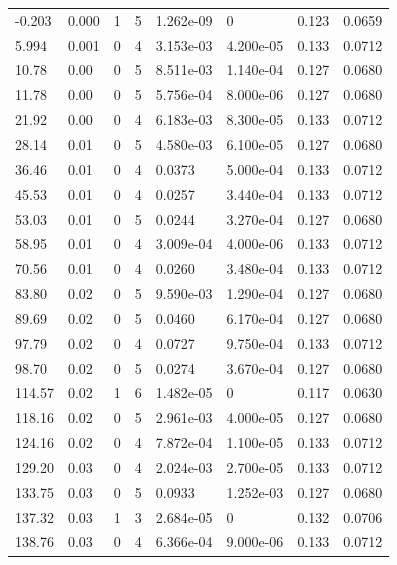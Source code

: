 \documentclass[preview]{standalone}
\begin{document}
{{\begin{tabular}{L{1.2cm}C{1.2cm} C{0.3cm}C{0.5cm} C{1.4cm}C{1.4cm} C{1.4cm}C{1.4cm}}
  -0.203  &  0.000  & 1     &  5 &  1.262e-09  & 0  & 0.123 &  0.0659   \\ 
  5.994  &  0.001  & 0     &  4 &  3.153e-03  & 4.200e-05  & 0.133 &  0.0712   \\ 
  10.78  &  0.00  & 0     &  5 &  8.511e-03  & 1.140e-04  & 0.127 &  0.0680   \\ 
  11.78  &  0.00  & 0     &  5 &  5.756e-04  & 8.000e-06  & 0.127 &  0.0680   \\ 
  21.92  &  0.00  & 0     &  4 &  6.183e-03  & 8.300e-05  & 0.133 &  0.0712   \\ 
  28.14  &  0.01  & 0     &  5 &  4.580e-03  & 6.100e-05  & 0.127 &  0.0680   \\ 
  36.46  &  0.01  & 0     &  4 &  0.0373  & 5.000e-04  & 0.133 &  0.0712   \\ 
  45.53  &  0.01  & 0     &  4 &  0.0257  & 3.440e-04  & 0.133 &  0.0712   \\ 
  53.03  &  0.01  & 0     &  5 &  0.0244  & 3.270e-04  & 0.127 &  0.0680   \\ 
  58.95  &  0.01  & 0     &  4 &  3.009e-04  & 4.000e-06  & 0.133 &  0.0712   \\ 
  70.56  &  0.01  & 0     &  4 &  0.0260  & 3.480e-04  & 0.133 &  0.0712   \\ 
  83.80  &  0.02  & 0     &  5 &  9.590e-03  & 1.290e-04  & 0.127 &  0.0680   \\ 
  89.69  &  0.02  & 0     &  5 &  0.0460  & 6.170e-04  & 0.127 &  0.0680   \\ 
  97.79  &  0.02  & 0     &  4 &  0.0727  & 9.750e-04  & 0.133 &  0.0712   \\ 
  98.70  &  0.02  & 0     &  5 &  0.0274  & 3.670e-04  & 0.127 &  0.0680   \\ 
  114.57  &  0.02  & 1     &  6 &  1.482e-05  & 0  & 0.117 &  0.0630   \\ 
  118.16  &  0.02  & 0     &  5 &  2.961e-03  & 4.000e-05  & 0.127 &  0.0680   \\ 
  124.16  &  0.02  & 0     &  4 &  7.872e-04  & 1.100e-05  & 0.133 &  0.0712   \\ 
  129.20  &  0.03  & 0     &  4 &  2.024e-03  & 2.700e-05  & 0.133 &  0.0712   \\ 
  133.75  &  0.03  & 0     &  5 &  0.0933  & 1.252e-03  & 0.127 &  0.0680   \\ 
  137.32  &  0.03  & 1     &  3 &  2.684e-05  & 0  & 0.132 &  0.0706   \\ 
  138.76  &  0.03  & 0     &  4 &  6.366e-04  & 9.000e-06  & 0.133 &  0.0712   \\ 

\end{tabular}}}
\end{document}
